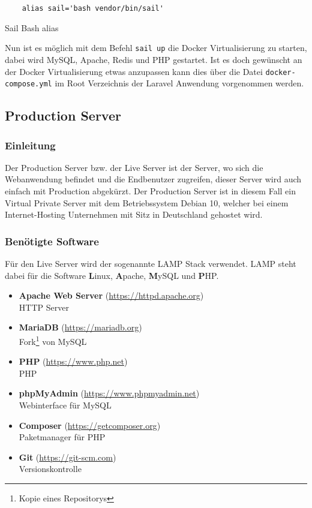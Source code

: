 \begin{listing}[H]
  \begin{verbatim}
    alias sail='bash vendor/bin/sail'
  \end{verbatim}
  \caption{Sail Bash alias}
\end{listing}

Nun ist es möglich mit dem Befehl \verb|sail up| die Docker Virtualisierung zu
starten, dabei wird MySQL, Apache, Redis und PHP gestartet. Ist es doch
gewünscht an der Docker Virtualisierung etwas anzupassen kann dies über die
Datei \verb|docker-compose.yml| im Root Verzeichnis der Laravel Anwendung
vorgenommen werden.

\subsection{Production Server}
\subsubsection{Einleitung}
Der Production Server bzw. der Live Server ist der Server, wo sich die
Webanwendung befindet und die Endbenutzer zugreifen, dieser Server wird auch
einfach mit Production abgekürzt. Der Production Server ist in diesem Fall ein
Virtual Private Server mit dem Betriebssystem Debian 10, welcher bei einem
Internet-Hosting Unternehmen mit Sitz in Deutschland gehostet wird.

\subsubsection{Benötigte Software}
Für den Live Server wird der sogenannte \glqq LAMP\grqq{} Stack verwendet. LAMP steht dabei
für die Software \textbf{L}inux, \textbf{A}pache, \textbf{M}ySQL und \textbf{P}HP.

\begin{itemize}
  \item \textbf{Apache Web Server} (\url{https://httpd.apache.org}) \\ HTTP Server
  \item \textbf{MariaDB} (\url{https://mariadb.org}) \\ Fork\footnote{Kopie eines Repositorys} von MySQL
  \item \textbf{PHP} (\url{https://www.php.net}) \\ \ac*{PHP}
  \item \textbf{phpMyAdmin} (\url{https://www.phpmyadmin.net}) \\ Webinterface
        für MySQL
  \item \textbf{Composer} (\url{https://getcomposer.org}) \\ Paketmanager für PHP
  \item \textbf{Git} (\url{https://git-scm.com}) \\ Versionskontrolle
\end{itemize}


